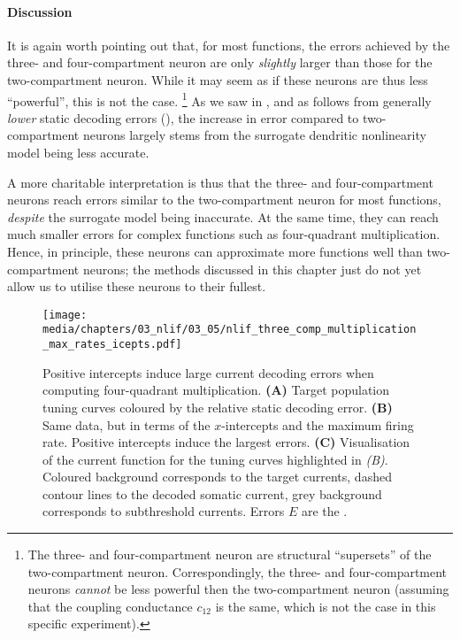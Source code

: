 \paragraph{Discussion}
It is again worth pointing out that, for most functions, the errors achieved by the three- and four-compartment neuron are only \emph{slightly} larger than those for the two-compartment neuron.
While it may seem as if these neurons are thus less \enquote{powerful}, this is not the case.%
\footnote{
The three- and four-compartment neuron are structural \enquote{supersets} of the two-compartment neuron.
Correspondingly, the three- and four-compartment neurons \emph{cannot} be less powerful then the two-compartment neuron (assuming that the coupling conductance $c_{12}$ is the same, which is not the case in this specific experiment).
}
As we saw in , and as follows from generally \emph{lower} static decoding errors (), the increase in error compared to two-compartment neurons largely stems from the surrogate dendritic nonlinearity model being less accurate.

A more charitable interpretation is thus that the three- and four-compartment neurons reach errors similar to the two-compartment neuron for most functions, \emph{despite} the surrogate model being inaccurate.
At the same time, they can reach much smaller errors for complex functions such as four-quadrant multiplication.
Hence, in principle, these neurons can approximate more functions well than two-compartment neurons; the methods discussed in this chapter just do not yet allow us to utilise these neurons to their fullest.

\begin{figure}
	\centering
	\texttt{[image: media/chapters/03\_nlif/03\_05/nlif\_three\_comp\_multiplication\_max\_rates\_icepts.pdf]}
	\caption[Positive intercepts induce large current decoding errors]{Positive intercepts induce large current decoding errors when computing four-quadrant multiplication.
	\textbf{(A)} Target population tuning curves coloured by the relative static decoding error.
	\textbf{(B)} Same data, but in terms of the $x$-intercepts and the maximum firing rate. Positive intercepts induce the largest errors. 
	\textbf{(C)} Visualisation of the current function for the tuning curves highlighted in \emph{(B)}. Coloured background corresponds to the target currents, dashed contour lines to the decoded somatic current, grey background corresponds to subthreshold currents.
	Errors $E$ are the \NRMSE.
	}
	\label{fig:nlif_three_comp_multiplication_max_rates_icepts}
\end{figure}


